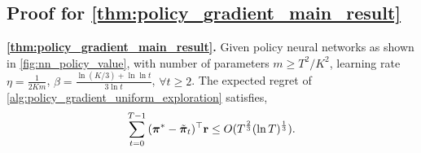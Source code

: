 \subsection{Proof for \cref{thm:policy_gradient_main_result} }

\textbf{\cref{thm:policy_gradient_main_result}.}
	Given policy neural networks as shown in \cref{fig:nn_policy_value}, with number of parameters $m \ge T^2 / K^2$, learning rate $\eta = \frac{1}{2 K m}$, $\beta = \frac{ \ln{(K/3) + \ln{\ln{t}} } }{ 3 \ln{t}}$, $\forall t \ge 2$. The expected regret of \cref{alg:policy_gradient_uniform_exploration} satisfies,
	\begin{equation*}
	\begin{split}
	\sum\limits_{t=0}^{T-1}{ ( {\boldsymbol{\pi}}^* - \tilde{{\boldsymbol{\pi}}}_t )^\top {\mathbf{r}}} \le O(T^{\frac{2}{3}}( \ln{T})^{\frac{1}{3}}).
	\end{split}
	\end{equation*}

